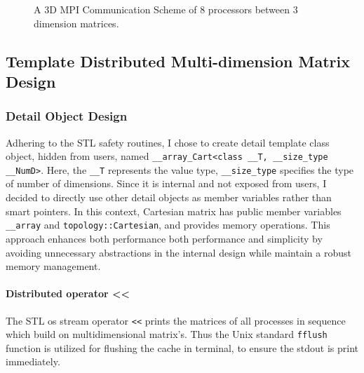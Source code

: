 \begin{figure}[htbp]
  \caption{A 3D MPI Communication Scheme of $8$ processors between $3$ dimension matrices.}
  \label{FIG_MPI_3D_Example_SCHEME}
\end{figure}


\subsection{Template Distributed Multi-dimension Matrix Design}
\subsubsection{Detail Object Design}
Adhering to the STL safety routines, I chose to create detail template class object, hidden from users,
named \texttt{\_\_array\_Cart<class \_\_T, \_\_size\_type \_\_NumD>}.
Here, the \texttt{\_\_T} represents the value type, \texttt{\_\_size\_type} specifies the type of number of dimensions.
Since it is internal and not exposed from users, I decided to directly use other detail objects as member variables rather than 
smart pointers.
In this context, Cartesian matrix has public member variables \texttt{\_\_array} and \texttt{topology::Cartesian},
and provides memory operations. 
This approach enhances both performance both performance and simplicity by avoiding unnecessary abstractions in the internal design 
while maintain a robust memory management.

\paragraph{Distributed operator <<}
The STL os stream operator \texttt{<<} prints the matrices of all processes in sequence which build on multidimensional matrix's. 
Thus the Unix standard \texttt{fflush} function is utilized for flushing the cache in terminal, to ensure the stdout is print immediately.

